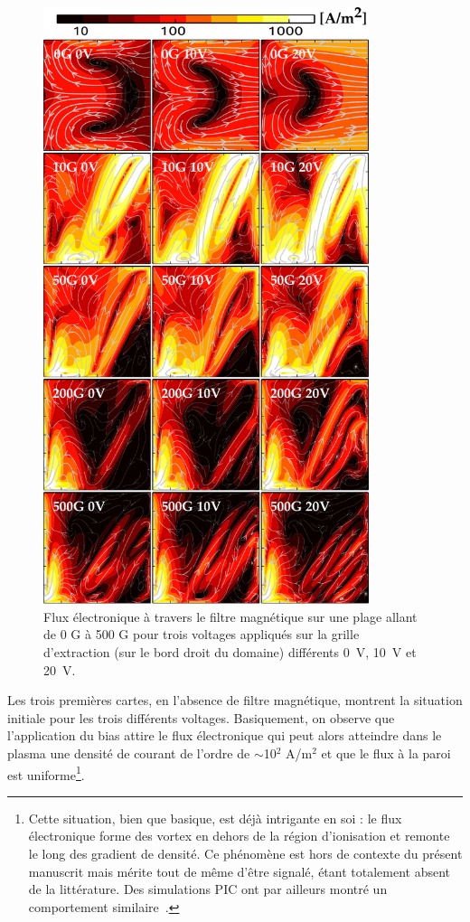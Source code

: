 \begin{refsection}
 \begin{figure}[!htbp]
	\centering
	\includegraphics[width=0.85\textwidth]{figures/4-pegasesfluxElectronique.pdf}
	{\caption{Flux électronique à travers le filtre magnétique sur une plage
	allant de 0 G à 500 G pour trois voltages appliqués sur la grille
	d'extraction (sur le bord droit du domaine) différents 0~V, 10~V et 20~V.}
	\label{4-pegasesfluxElectronique}}
	\end{figure}

Les trois premières cartes, en l'absence de filtre magnétique, montrent la
situation initiale pour les trois différents voltages. Basiquement, on observe
que l'application du bias attire le flux électronique qui peut alors atteindre
dans le plasma une densité de courant de l'ordre de $\sim$10$^2$ A/m$^2$ et que
le flux à la paroi est uniforme\footnote{Cette
situation, bien que basique, est déjà intrigante en soi : le flux électronique
forme des vortex en dehors de la région d'ionisation et remonte le long des
gradient de densité. Ce phénomène est hors de contexte du présent
manuscrit mais mérite tout de même d'être signalé, étant totalement absent de
la littérature.
Des simulations PIC ont par ailleurs montré un comportement
similaire~\parencite{PIC3D}.}.


\end{refsection}
